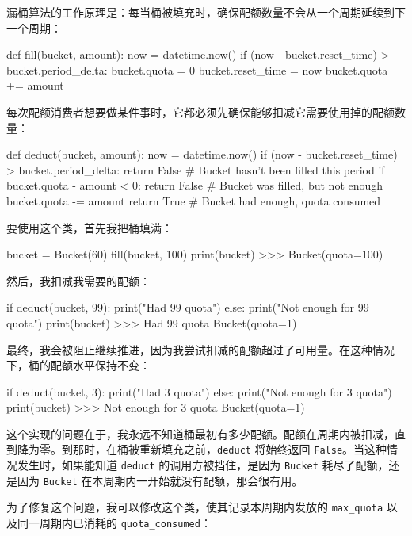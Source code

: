漏桶算法的工作原理是：每当桶被填充时，确保配额数量不会从一个周期延续到下一个周期：

\begin{codebox}[python]
def fill(bucket, amount):
    now = datetime.now()
    if (now - bucket.reset_time) > bucket.period_delta:
        bucket.quota = 0
        bucket.reset_time = now
    bucket.quota += amount
\end{codebox}

每次配额消费者想要做某件事时，它都必须先确保能够扣减它需要使用掉的配额数量：

\begin{codebox}[python]
def deduct(bucket, amount):
    now = datetime.now()
    if (now - bucket.reset_time) > bucket.period_delta:
        return False  # Bucket hasn't been filled this period
    if bucket.quota - amount < 0:
        return False  # Bucket was filled, but not enough
    bucket.quota -= amount
    return True       # Bucket had enough, quota consumed
\end{codebox}

要使用这个类，首先我把桶填满：

\begin{codebox}[python]
bucket = Bucket(60)
fill(bucket, 100)
print(bucket)
>>>
Bucket(quota=100)
\end{codebox}

然后，我扣减我需要的配额：

\begin{codebox}[python]
if deduct(bucket, 99):
    print("Had 99 quota")
else:
    print("Not enough for 99 quota")
print(bucket)
>>>
Had 99 quota
Bucket(quota=1)
\end{codebox}

最终，我会被阻止继续推进，因为我尝试扣减的配额超过了可用量。在这种情况下，桶的配额水平保持不变：

\begin{codebox}[python]
if deduct(bucket, 3):
    print("Had 3 quota")
else:
    print("Not enough for 3 quota")
print(bucket)
>>>
Not enough for 3 quota
Bucket(quota=1)
\end{codebox}

这个实现的问题在于，我永远不知道桶最初有多少配额。配额在周期内被扣减，直到降为零。到那时，在桶被重新填充之前，\texttt{deduct} 将始终返回 \texttt{False}。当这种情况发生时，如果能知道 \texttt{deduct} 的调用方被挡住，是因为 \texttt{Bucket} 耗尽了配额，还是因为 \texttt{Bucket} 在本周期内一开始就没有配额，那会很有用。

为了修复这个问题，我可以修改这个类，使其记录本周期内发放的 \texttt{max\_quota} 以及同一周期内已消耗的 \texttt{quota\_consumed}：

